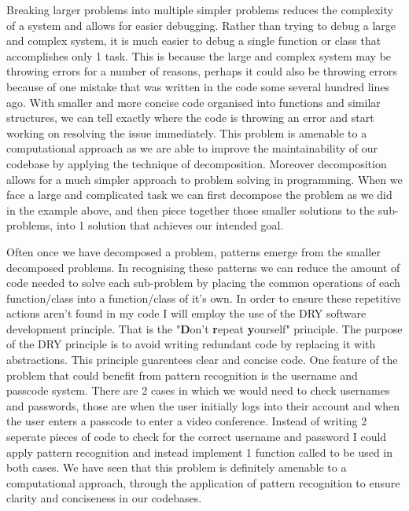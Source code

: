 Breaking larger problems into multiple simpler problems 
reduces the complexity of a system and allows for easier 
debugging. Rather than trying to debug a large and complex 
system, it is much easier to debug a single function or class
that accomplishes only 1 task. This is because the large and 
complex system may be throwing errors for a number of reasons, 
perhaps it could also be throwing errors because of one 
mistake that was written in the code some several hundred lines
ago. With smaller and more concise code organised into
functions and similar structures, we can tell exactly where the
code is throwing an error and start working on resolving the 
issue immediately. This problem is amenable to a computational 
approach as we are able to improve the maintainability of our
codebase by applying the technique of decomposition. Moreover
decomposition allows for a much simpler approach to problem 
solving in programming. When we face a large and complicated 
task we can first decompose the problem as we did in the 
example above, and then piece together those smaller solutions
to the sub-problems, into 1 solution that achieves our intended
goal. \vspace{0.2cm}

Often once we have decomposed a problem, patterns emerge from 
the smaller decomposed problems. In recognising these patterns
we can reduce the amount of code needed to solve each 
sub-problem by placing the common operations of each 
function/class into a function/class of it's own. In order to 
ensure these repetitive actions aren't found in my code I will
employ the use of the DRY software development principle. 
That is the "\textbf{D}on't \textbf{r}epeat \textbf{y}ourself"
principle. The purpose of the DRY principle is to avoid 
writing redundant code by replacing it with abstractions. This
principle guarentees clear and concise code. One feature of 
the problem that could benefit from pattern recognition is the 
username and passcode system. There are 2 cases in which we 
would need to check usernames and passwords, those are when the
user initially logs into their account and when the user enters
a passcode to enter a video conference. Instead of writing 2 
seperate pieces of code to check for the correct username and 
password I could apply pattern recognition and instead 
implement 1 function called 
to be used in both cases. We have seen that this problem is
definitely amenable to a computational approach, through the 
application of pattern recognition to ensure clarity and 
conciseness in our codebases. \vspace{0.2cm}


